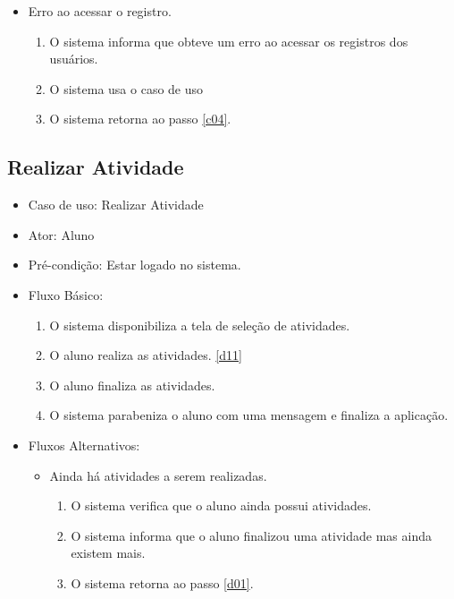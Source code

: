 \documentclass{utfpr-pg}
\begin{document}
\begin{itemize}
\begin{itemize}
            \item Erro ao acessar o registro.
            \begin{enumerate}[label=\textbf{C3.\arabic*}]
                \item \label{c31} O sistema informa que obteve um erro ao acessar os registros dos usuários.
                \item O sistema usa o caso de uso \textbf{\textit{}}
                \item O sistema retorna ao passo \ref{c04}.
            \end{enumerate}
        \end{itemize}
        
    \end{itemize}
    
    
    \subsection{Realizar Atividade}
    
    \begin{itemize}
        \item Caso de uso: Realizar Atividade
        \item Ator: Aluno
        \item Pré-condição: Estar logado no sistema.
        \item Fluxo Básico:
        \begin{enumerate}[label=\textbf{D0.\arabic*}]
            \item \label{d01} O sistema disponibiliza a tela de seleção de atividades.
            \item O aluno realiza as atividades. \ref{d11}
            \item O aluno finaliza as atividades.
            \item O sistema parabeniza o aluno com uma mensagem e finaliza a aplicação.
            
        \end{enumerate}
        
        \item Fluxos Alternativos:
        \begin{itemize}
            \item Ainda há atividades a serem realizadas.
            \begin{enumerate}[label=\textbf{D1.\arabic*}]
                \item \label{d11} O sistema verifica que o aluno ainda possui atividades.
                \item O sistema informa que o aluno finalizou uma atividade mas ainda existem mais.
                \item O sistema retorna ao passo \ref{d01}.
            \end{enumerate}
            
        \end{itemize}
        
    \end{itemize}
    
\end{document}
